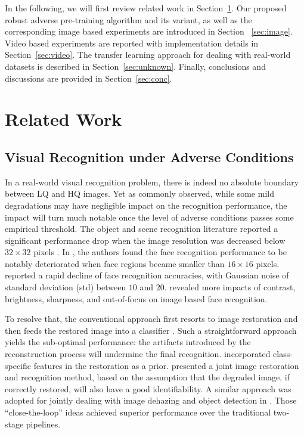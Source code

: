 \documentclass[10pt,twocolumn,twoside]{IEEEtran} %
\begin{document}
In the following, we will first review related work in Section~\ref{sec:related}.
Our proposed robust adverse pre-training algorithm and its variant, as well as the corresponding image based experiments are introduced in Section ~\ref{sec:image}.
Video based experiments are reported with implementation details in Section~\ref{sec:video}.
The transfer learning approach for dealing with real-world datasets is described in Section~\ref{sec:unknown}.
Finally, conclusions and discussions are provided in Section~\ref{sec:conc}.
\section{Related Work}\label{sec:related}\subsection{Visual Recognition under Adverse Conditions}

In a real-world visual recognition problem, there is indeed no absolute boundary between LQ and HQ images. Yet as commonly observed, while some mild degradations may have negligible impact on the recognition performance, the impact will turn much notable once the level of adverse conditions passes some empirical threshold. The object and scene recognition literature reported a significant performance drop when the image resolution was decreased below $32 \times 32$ pixels \cite{80tiny}. In \cite{VFR}, the authors found the face recognition performance to be notably deteriorated when face regions became smaller than $16 \times 16$ pixels. \cite{karahan2016image} reported a rapid decline of face recognition accuracies, with Gaussian noise of standard deviation (std) between $10$ and $20$. \cite{DVS12, ab14} revealed more impacts of contrast, brightness, sharpness, and out-of-focus on image based face recognition. 

To resolve that, the conventional approach first resorts to image restoration and then feeds the restored image into a classifier \cite{fergus2006removing,yang2010image,liu2017robust}. Such a straightforward approach yields the sub-optimal performance: the artifacts introduced by the reconstruction process will undermine the final recognition. \cite{VFR, cvpr08} incorporated class-specific features in the restoration as a prior. \cite{zhang2011close} presented a joint image restoration and recognition method, based on the assumption that the degraded image, if correctly restored, will also have a good identifiability.
A similar approach was adopted for jointly dealing with image dehazing and object detection in \cite{li2017aod}.
Those ``close-the-loop'' ideas achieved superior performance over the traditional two-stage pipelines. 
\end{document}
